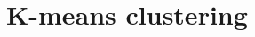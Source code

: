 %

\chapter{K-means clustering}
\label{chapter:kmeans}








\begin{comment}

 

\appendix




\end{comment}
